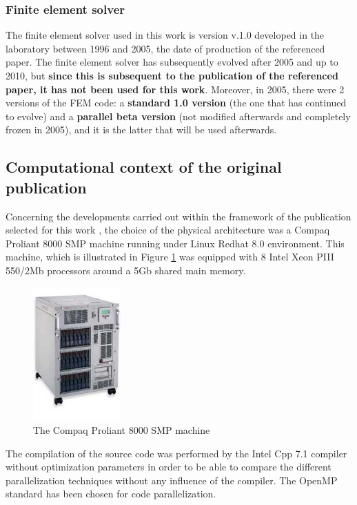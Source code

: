 \subsubsection{Finite element solver}

The finite element solver used in this work is version v.1.0 developed in the laboratory between 1996 and 2005, the date of production of the referenced paper. The finite element solver has subsequently evolved after 2005 and up to 2010, but \textbf{since this is subsequent to the publication of the referenced paper, it has not been used for this work}. Moreover, in 2005, there were 2 versions of the FEM code: a \textbf{standard 1.0 version} (the one that has continued to evolve) and a \textbf{parallel beta version} (not modified afterwards and completely frozen in 2005), and it is the latter that will be used afterwards.

\subsection{Computational context of the original publication}
Concerning the developments carried out within the framework of the publication selected for this work \cite{Pantale:2005}, the choice of the physical architecture was a Compaq Proliant 8000 SMP machine running under Linux Redhat 8.0 environment. This machine, which is illustrated in Figure \ref{proliant} was equipped with 8 Intel Xeon PIII 550/2Mb processors around a 5Gb shared main memory. 
\begin{figure}[h] 
  \centering
  \includegraphics[width=0.3\textwidth]{./8000_photo.jpg}
  \caption{The Compaq Proliant 8000 SMP machine}
  \label{proliant}
\end{figure}
The compilation of the source code was performed by the Intel Cpp 7.1 compiler without optimization parameters in order to be able to compare the different parallelization techniques without any influence of the compiler. The OpenMP standard has been chosen for code parallelization.

